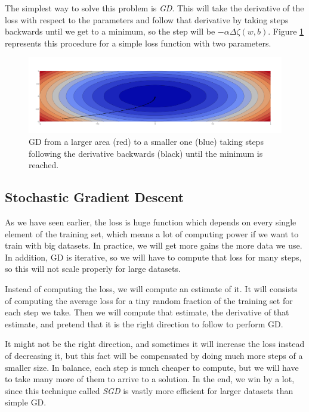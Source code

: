 \documentclass[english, 11pt]{article}
\begin{document}
	The simplest way to solve this problem is \emph{\ac{GD}}. This will take the derivative of the loss with respect to the parameters and follow that derivative by taking steps backwards until we get to a minimum, so the step will be $-\alpha\Delta\zeta(w, b)$. Figure \ref{fig:gradient-descent} represents this procedure for a simple loss function with two parameters.

	\begin{figure}[!hbt]
		\centering
		\includegraphics[width=\textwidth]{l1/figures/contour-scatter}
		\caption{\ac{GD} from a larger area (red) to a smaller one (blue) taking steps following the derivative backwards (black) until the minimum is reached.}
		\label{fig:gradient-descent}
	\end{figure}

	\subsection{Stochastic Gradient Descent}

	As we have seen earlier, the loss is huge function which depends on every single element of the training set, which means a lot of computing power if we want to train with big datasets. In practice, we will get more gains the more data we use. In addition, \ac{GD} is iterative, so we will have to compute that loss for many steps, so this will not scale properly for large datasets.

	Instead of computing the loss, we will compute an estimate of it. It will consists of computing the average loss for a tiny random fraction of the training set for each step we take. Then we will compute that estimate, the derivative of that estimate, and pretend that it is the right direction to follow to perform \ac{GD}.

	It might not be the right direction, and sometimes it will increase the loss instead of decreasing it, but this fact will be compensated by doing much more steps of a smaller size. In balance, each step is much cheaper to compute, but we will have to take many more of them to arrive to a solution. In the end, we win by a lot, since this technique called \emph{\ac{SGD}} is vastly more efficient for larger datasets than simple \ac{GD}.
\end{document}
